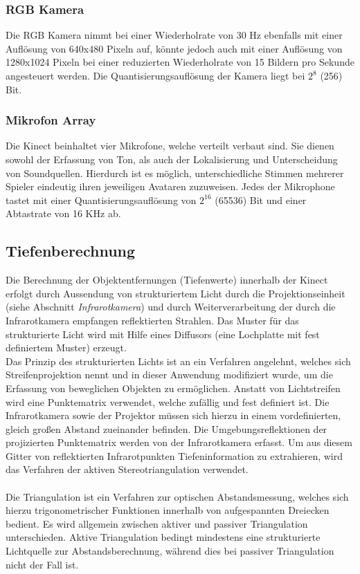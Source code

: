 \subsubsection{RGB Kamera}
Die RGB Kamera nimmt bei einer Wiederholrate von 30 Hz ebenfalls mit einer Auflösung von 640x480 Pixeln auf, könnte jedoch auch mit einer Auflösung von 1280x1024 Pixeln bei einer reduzierten Wiederholrate von 15 Bildern pro Sekunde angesteuert werden.
Die Quantisierungsauflösung der Kamera liegt bei $2^{8}$ (256) Bit. 
\subsubsection{Mikrofon Array}
Die Kinect beinhaltet vier Mikrofone, welche verteilt verbaut sind. Sie dienen sowohl der Erfassung von Ton, als auch der Lokalisierung und Unterscheidung von Soundquellen. Hierdurch ist es möglich, unterschiedliche Stimmen mehrerer Spieler eindeutig ihren jeweiligen Avataren zuzuweisen. Jedes der Mikrophone tastet mit einer Quantisierungsauflösung von $2^{16}$ (65536) Bit und einer Abtastrate von 16 KHz ab.
\subsection{Tiefenberechnung}
Die Berechnung der Objektentfernungen (Tiefenwerte) innerhalb der Kinect erfolgt durch Aussendung von strukturiertem Licht durch die Projektionseinheit (siehe Abschnitt \emph{Infrarotkamera}) und durch Weiterverarbeitung der durch die Infrarotkamera empfangen reflektierten Strahlen. Das Muster für das strukturierte Licht wird mit Hilfe eines Diffusors (eine Lochplatte mit fest definiertem Muster) erzeugt.\\
Das Prinzip des strukturierten Lichts ist an ein Verfahren angelehnt, welches sich Streifenprojektion nennt und in dieser Anwendung modifiziert wurde, um die Erfassung von beweglichen Objekten zu ermöglichen. Anstatt von Lichtstreifen wird eine Punktematrix verwendet, welche zufällig und fest definiert ist. Die Infrarotkamera sowie der Projektor müssen sich hierzu in einem vordefinierten, gleich großen Abstand zueinander befinden.
Die Umgebungsreflektionen der projizierten Punktematrix werden von der Infrarotkamera erfasst.
Um aus diesem Gitter von reflektierten Infrarotpunkten Tiefeninformation zu extrahieren, wird das Verfahren der aktiven Stereotriangulation verwendet.\\\\
Die Triangulation ist ein Verfahren zur optischen Abstandsmessung, welches sich hierzu trigonometrischer Funktionen innerhalb von aufgespannten Dreiecken bedient. 
Es wird allgemein zwischen aktiver und passiver Triangulation unterschieden.
Aktive Triangulation bedingt mindestens eine strukturierte Lichtquelle zur Abstandsberechnung, während dies bei passiver Triangulation nicht der Fall ist.\\

